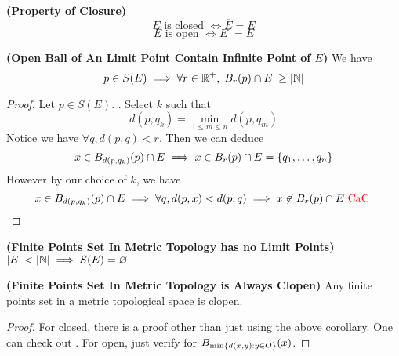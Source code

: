 \documentclass{report}
\begin{document}
\begin{corollary}
\label{2.7.19}
\textbf{(Property of Closure)}
\begin{equation}
\text{ $E$ is closed $\iff \overline{E}=E$ }
\end{equation}
\begin{equation}
\text{ $E$ is open $\iff E^\circ =E$ }
\end{equation}
\end{corollary}
\begin{theorem}
\label{2.7.20}
\textbf{(Open Ball of An Limit Point Contain Infinite Point of $E$)} We have
 \begin{equation}
p\in S(E)\implies \forall r\in\mathbb{R}^+, |B_r(p)\cap E|\geq |\mathbb{N}|
\end{equation}
\end{theorem}
\begin{proof}
Let $p \in S(E)$. . Select $k$ such that
\begin{equation}
d(p,q_k)= \min_{1\leq m\leq n}d(p,q_m)
\end{equation}
Notice we have $\forall q, d(p,q)<r$. Then we can deduce 
\begin{equation}
x \in B_{d(p,q_k)}(p)\cap E\implies x \in B_r(p)\cap E=\{ q_1,\dots, q_n \}
\end{equation}
However by our choice of $k$, we have
 \begin{equation}
x\in B_{d(p,q_k)}(p)\cap E\implies \forall q,d(p,x)<d(p,q)\implies x\not \in B_r(p)\cap E\text{ \textcolor{red}{CaC} }
\end{equation}
\end{proof}
\begin{corollary}
\label{2.7.21}
\textbf{(Finite Points Set In Metric Topology has no Limit Points)} $\abso{E}<\abso{\N}\implies S(E)=\varnothing$
\end{corollary}
\begin{corollary}
\label{2.7.22}
\textbf{(Finite Points Set In Metric Topology is Always Clopen)} Any finite points set in a metric topological space is clopen. 
\end{corollary}
\begin{proof}
For closed, there is a proof other than just using the above corollary. One can check out . For open, just verify for $B_{\min \{ d(x,y):y \in O \}}(x)$. 
\end{proof}
\end{document}
